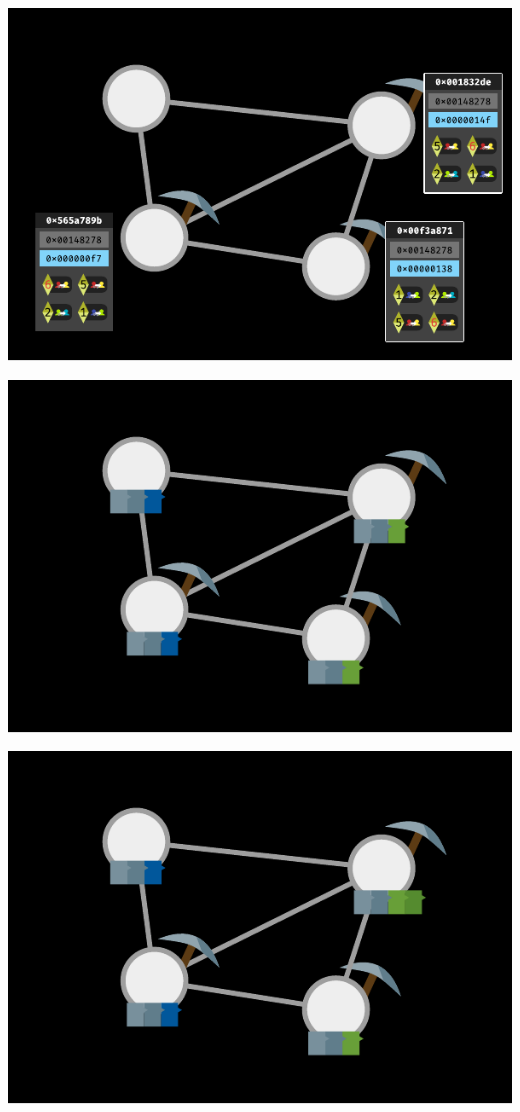 \documentclass[xcolor=x11names,compress]{beamer}
\begin{document}
\begin{frame}
\begin{overprint}
\begin{center}
		\end{center}
		\begin{center}
			\includegraphics[width=\textwidth,height=0.8\textheight,keepaspectratio]{img/mining/12.pdf}
		\end{center}
		\begin{center}
			\includegraphics[width=\textwidth,height=0.8\textheight,keepaspectratio]{img/mining/13.pdf}
		\end{center}
		\begin{center}
			\includegraphics[width=\textwidth,height=0.8\textheight,keepaspectratio]{img/mining/14.pdf}

\end{center}
\end{overprint}
\end{frame}
\end{document}
